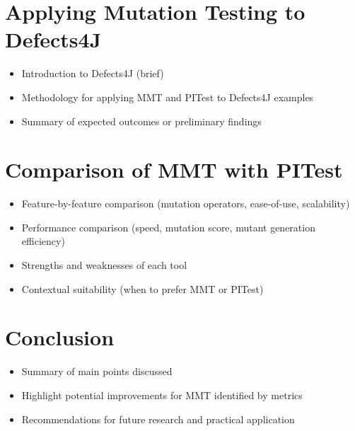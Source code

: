 \documentclass[sigplan, nonacm]{acmart}
\begin{document}
\section{Applying Mutation Testing to Defects4J}
\begin{itemize}
    \item Introduction to Defects4J (brief)
    \item Methodology for applying MMT and PITest to Defects4J examples
    \item Summary of expected outcomes or preliminary findings
\end{itemize}

\section{Comparison of MMT with PITest}
\begin{itemize}
    \item Feature-by-feature comparison (mutation operators, ease-of-use, scalability)
    \item Performance comparison (speed, mutation score, mutant generation efficiency)
    \item Strengths and weaknesses of each tool
    \item Contextual suitability (when to prefer MMT or PITest)
\end{itemize}

\section{Conclusion}
\begin{itemize}
    \item Summary of main points discussed
    \item Highlight potential improvements for MMT identified by metrics
    \item Recommendations for future research and practical application
\end{itemize}



\end{document}
